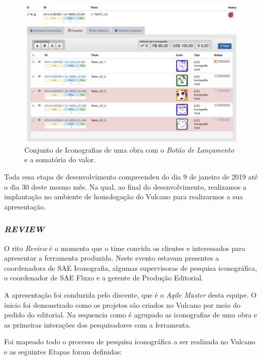 \documentclass[
  12pt,            %
  openany,
  oneside,
  a4paper,         %
  english,      %
  brazil
]{article}
\numberwithin{figure}{section}
\numberwithin{table}{section}
\begin{document}
\begin{figure}[H]
  \centering
  \includegraphics[width=0.9\linewidth]{iconr_launch_checklist}
  \caption{Conjunto de Iconografias de uma obra com o \textit{Botão de Lançamento} e a somatória do valor.}
  \label{fig:iconr:checklist}
\end{figure}

Toda essa etapa de desenvolvimento compreendeu do dia 9 de janeiro de 2019 até o dia 30 deste mesmo mês. Na qual, ao final do desenvolvimento, realizamos a implantação no ambiente de homologação do Vulcano para realizarmos a sua apresentação.


\subsubsection{\textit{REVIEW}}

O rito \textit{Review} é o momento que o time convida os clientes e interessados para apresentar a ferramenta produzida. Neste evento estavam presentes a coordenadora de SAE Iconografia, algumas supervisoras de pesquisa iconográfica, o coordenador de SAE Fluxo e a gerente de Produção Editorial.

A apresentação foi conduzida pelo discente, que é o \textit{Agile Master} desta equipe. O inicio foi demonstrado como os projetos são criados no Vulcano por meio do pedido do editorial. Na sequencia como é agrupado as iconografias de uma obra e as primeiras interações dos pesquisadores com a ferramenta.

Foi mapeado todo o processo de pesquisa iconográfica a ser realizada no Vulcano e as seguintes Etapas foram definidas:
\end{document}
